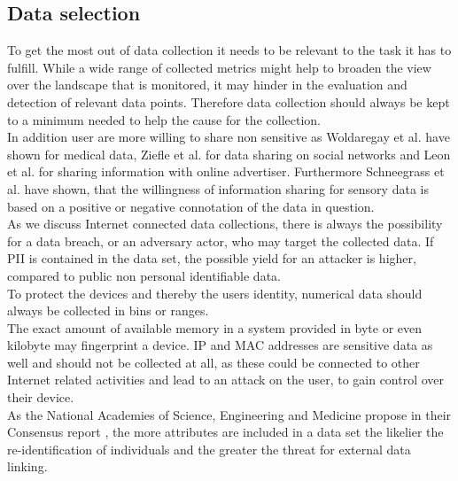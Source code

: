     \subsection{Data selection}
        \label{subsec:software_design:selection}
        To get the most out of data collection it needs to be relevant to the task it has to fulfill.
        While a wide range of collected metrics might help to broaden the view over the landscape that is monitored, it may hinder in the evaluation and detection of relevant data points. Therefore data collection should always be kept to a minimum needed to help the cause for the collection.\\
        In addition user are more willing to share non sensitive as Woldaregay et al. \cite{woldaregay_user_2020} have shown for medical data, Ziefle et al.\cite{ziefle_users_2016} for data sharing on social networks and Leon et al. \cite{leon_what_2013} for sharing information with online advertiser. Furthermore Schneegrass et al. \cite{10.1145/3290605.3300753} have shown, that the willingness of information sharing for sensory data is based on a positive or negative connotation of the data in question.\\
        
        As we discuss Internet connected data collections, there is always the possibility for a data breach, or an adversary actor, who may target the collected data. If PII is contained in the data set, the possible yield for an attacker is higher, compared to public non personal identifiable data.\\
        To protect the devices and thereby the users identity, numerical data should always be collected in bins or ranges.\\
        The exact amount of available memory in a system provided in byte or even kilobyte may fingerprint a device. IP and MAC addresses are sensitive data as well and should not be collected at all, as these could be connected to other Internet related activities and lead to an attack on the user, to gain control over their device. \\
        As the National Academies of Science, Engineering and Medicine propose in their Consensus report \cite{groves_federal_2017}, the more attributes are included in a data set the likelier the re-identification of individuals and the greater the threat for external data linking.\\
        

